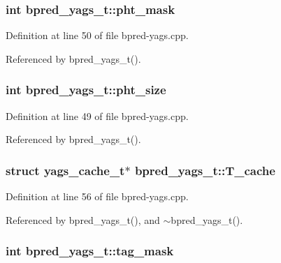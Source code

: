 \subsubsection[{pht\_\-mask}]{\setlength{\rightskip}{0pt plus 5cm}int {\bf bpred\_\-yags\_\-t::pht\_\-mask}\hspace{0.3cm}{\tt  [protected]}}\label{classbpred__yags__t_4177d8b4f28c1d697fe8c1474aa0bef7}




Definition at line 50 of file bpred-yags.cpp.

Referenced by bpred\_\-yags\_\-t().
\subsubsection[{pht\_\-size}]{\setlength{\rightskip}{0pt plus 5cm}int {\bf bpred\_\-yags\_\-t::pht\_\-size}\hspace{0.3cm}{\tt  [protected]}}\label{classbpred__yags__t_bb9d6388d1186c001f76f0e20747e17c}




Definition at line 49 of file bpred-yags.cpp.

Referenced by bpred\_\-yags\_\-t().
\subsubsection[{T\_\-cache}]{\setlength{\rightskip}{0pt plus 5cm}struct {\bf yags\_\-cache\_\-t}$\ast$ {\bf bpred\_\-yags\_\-t::T\_\-cache}\hspace{0.3cm}{\tt  [read, protected]}}\label{classbpred__yags__t_f9c1cd23489d1542df83f7bd492176c0}




Definition at line 56 of file bpred-yags.cpp.

Referenced by bpred\_\-yags\_\-t(), and $\sim$bpred\_\-yags\_\-t().
\subsubsection[{tag\_\-mask}]{\setlength{\rightskip}{0pt plus 5cm}int {\bf bpred\_\-yags\_\-t::tag\_\-mask}\hspace{0.3cm}{\tt  [protected]}}\label{classbpred__yags__t_6b5b845dfcf16672072856b747dfaab7}




